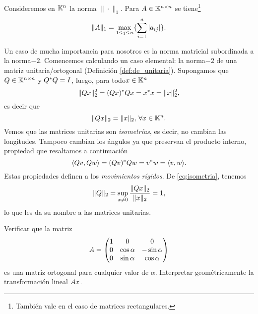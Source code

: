 \begin{ejemplo}
Consideremos en $\mathbb K^n$ la norma $\|\cdot\|_1$. Para $\Ab\in \Knn$ se tiene\footnote{También vale  en el caso de matrices rectangulares.}
\tcc
$$
 \|\Ab\|_1=\max_{1\le j\le n}\{\sum_{i=1}^{n} |a_{ij}|\}.
$$
\etcc
\end{ejemplo}
Un caso de mucha importancia para nosotros es la norma matricial subordinada a la norma$-2$.
Comencemos calculando un caso elemental: la norma$-2$ de una matriz unitaria/ortogonal (Definición \ref{def:de_unitaria}).
Supongamos que $\Qb\in \Knn$ y $\Qb^*\Qb=\Ib$, luego, para todo$\xb\in\Kn$
$$
\|\Qb\xb\|_2^2=(\Qb\xb)^*\Qb\xb=\xb^*\xb=\|\xb\|^2_2,
$$
es decir que
\begin{equation}
\label{eq:isometria}
\|\Qb\xb\|_2=\|\xb\|_2, \, \forall \xb\in \K^n.
\end{equation}
 Vemos que las matrices unitarias son \emph{isometrías}, es decir, no cambian las longitudes. Tampoco cambian los ángulos ya que preservan el producto interno, propiedad que resaltamos a continuación
 \tcc
 \begin{equation}
 \label{eq:preservaPI}
\langle \Qb\vb,\Qb\wb \rangle=(\Qb\vb)^*\Qb\wb=\vb^*\wb=\langle \vb,\wb \rangle.
 \end{equation}
\etcc
Estas propiedades definen a los \emph{movimientos rígidos}. De \eqref{eq:isometria}, tenemos
$$
\|\Qb\|_2=\sup_{\xb\neq\cero}\frac{\|\Qb\xb\|_2}{\|\xb\|_2}=1,
$$
lo que les da su nombre a las matrices unitarias.
\begin{ejercicio}Verificar que la matriz
$$
\Ab = \begin{pmatrix}
1 & 0 & 0 \\ 0 & \cos \alpha & -\sin \alpha \\ 0 & \sin \alpha & \cos \alpha
\end{pmatrix}
$$
es una matriz ortogonal para cualquier valor de $\alpha$. Interpretar geométricamente la transformación lineal $\Ab\xb$.
\end{ejercicio}


